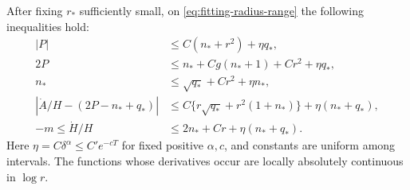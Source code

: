 \begin{lemma}\label{lem:interval-frequency}
After fixing $r_*$ sufficiently small, on
\eqref{eq:fitting-radius-range} the following inequalities hold:
\begin{align}
 |P|&\le C(n_*+r^2)+\eta q_* ,\label{eq:freq-absolute}\\
 2P&\le n_*+Cg(n_*+1)+Cr^2+\eta q_* ,\label{eq:freq-signed}\\
 n_*&\le\sqrt{q_*}+Cr^2+\eta n_* ,\label{eq:freq-flux}\\
 \left|\dot A/H-(2P-n_*+q_*)\right|
 &\le C\{r\sqrt{q_*}+r^2(1+n_*)\}+\eta(n_*+q_*),
                                      \label{eq:freq-horizontal}\\
 -m\le\dot H/H&\le2n_*+Cr+\eta(n_*+q_*).
                                      \label{eq:freq-height}
\end{align}
Here $\eta=C\delta^\alpha\le C'e^{-cT}$ for fixed positive
$\alpha,c$, and constants are uniform among intervals. The functions
whose derivatives occur are locally absolutely continuous in $\log r$.
\end{lemma}

